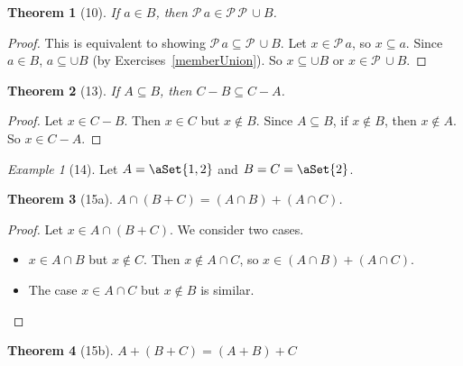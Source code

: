 \documentclass[12pt]{article}
\theoremstyle{plain}
\newtheorem*{exthm}{Theorem}
\theoremstyle{remark}
\newtheorem*{eg}{Example}
\theoremstyle{definition}
\theoremstyle{remark}
\newcommand{\powerset}{\mathscr{P}\,}
\DeclarePairedDelimiter\aSet\{\}
\begin{document}
\begin{exthm}[10]
If $a \in B$, then $\powerset a \in \powerset \powerset \cup B$.
\end{exthm}

\begin{proof}
This is equivalent to showing $\powerset a \subseteq \powerset \cup B$. Let $x \in \powerset a$, so $x \subseteq a$. Since $a \in B$, $a \subseteq \cup B$ (by Exercises~\ref{memberUnion}). So $x \subseteq \cup B$ or $x \in \powerset \cup B$.
\end{proof}

\begin{exthm}[13]
If $A \subseteq B$, then $C - B \subseteq C - A$.
\end{exthm}
\begin{proof}
Let $x \in C - B$. Then $x \in C$ but $x \not\in B$. Since $A \subseteq B$, if $x \not\in B$, then $x \not\in A$. So $x \in C - A$.
\end{proof}

\begin{eg}[14]
Let $A = \aSet{1,2}$ and $B = C = \aSet{2}$.
\end{eg}

\begin{exthm}[15a]
$A \cap (B + C) = (A \cap B) + (A \cap C)$.
\end{exthm}
\begin{proof}
Let $x \in A \cap (B + C)$. We consider two cases.
\begin{itemize}
\item $x \in A \cap B$ but $x \not\in C$. Then $x \not\in A \cap C$, so $x \in (A \cap B) + (A \cap C)$.
\item The case $x \in A \cap C$ but $x \not\in B$ is similar.
\end{itemize}
\end{proof}
\begin{exthm}[15b]
$A + (B + C) = (A + B) + C$
\end{exthm}
\end{document}

